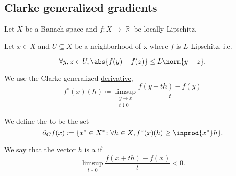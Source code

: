 \subsection{Clarke generalized gradients}\label{subsec:clarke_gradients}

Let \( X \) be a Banach space and \( f: X \to \BbbR \) be locally Lipschitz.

\begin{definition}\label{def:clarke_gradient}
  Let \( x \in X \) and \( U \subseteq X \) be a neighborhood of x where \( f \) is \( L \)-Lipschitz, i.e.

  \begin{equation*}
    \forall y, z \in U, \abs{f(y) - f(z)} \leq L \norm{y - z}.
  \end{equation*}

  We use the Clarke generalized \hyperref[def:nonsmooth_derivatives/clarke]{derivative},
  \begin{equation*}
    f^\circ(x)(h) \coloneqq \limsup_{\substack{y \to x \\ t \downarrow 0}} \frac {f(y + th) - f(y)} t
  \end{equation*}

  We define the  to be the set
  \begin{equation*}
    \partial_C f(x) \coloneqq \{ x^* \in X^* \colon \forall h \in X, f^\circ(x)(h) \geq \inprod {x^*} h \}.
  \end{equation*}

  We say that the vector \( h \) is a  if
  \begin{equation*}
    \limsup_{t \downarrow 0} \frac {f(x + th) - f(x)} t < 0.
  \end{equation*}
\end{definition}


